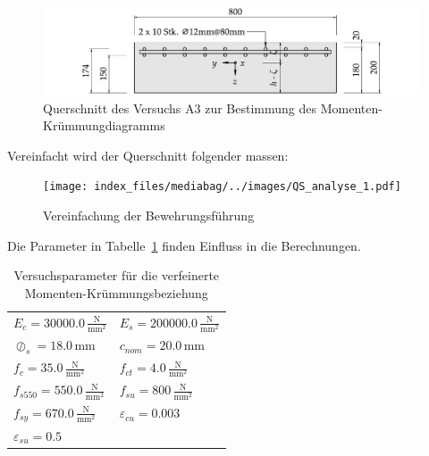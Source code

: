 \documentclass[
  letterpaper,
]{scrreprt}
\begin{document}
\begin{figure}[H]

{\centering \includegraphics{index_files/mediabag/../images/QS_Versuch_A3.pdf}

}

\caption{\label{fig-qs_a3}Querschnitt des Versuchs A3 zur Bestimmung des
Momenten-Krümmungdiagramms}

\end{figure}

Vereinfacht wird der Querschnitt folgender massen:

\begin{figure}[H]

{\centering \texttt{[image: index\_files/mediabag/../images/QS\_analyse\_1.pdf]}

}

\caption{Vereinfachung der Bewehrungsführung}

\end{figure}

Die Parameter in Tabelle~\ref{tbl-params_krummung} finden Einfluss in
die Berechnungen.

\hypertarget{tbl-params_krummung}{}
\begin{longtable}[]{@{}
  >{\raggedright\arraybackslash}p{}
  >{\raggedright\arraybackslash}p{}@{}}
\caption{\label{tbl-params_krummung}Versuchsparameter für die
verfeinerte Momenten-Krümmungsbeziehung}\tabularnewline
\toprule\noalign{}
\endfirsthead
\endhead
\bottomrule\noalign{}
\endlastfoot
\(E_{c} = 30000.0 \, \frac{\text{N}}{\text{mm}^{2}}\) &
\(E_{s} = 200000.0 \, \frac{\text{N}}{\text{mm}^{2}}\) \\
\(\oslash_{s} = 18.0 \, \text{mm}\) & \(c_{nom} = 20.0 \, \text{mm}\) \\
\(f_{c} = 35.0 \, \frac{\text{N}}{\text{mm}^{2}}\) &
\(f_{ct} = 4.0 \, \frac{\text{N}}{\text{mm}^{2}}\) \\
\(f_{s550} = 550.0 \, \frac{\text{N}}{\text{mm}^{2}}\) &
\(f_{su} = 800 \, \frac{\text{N}}{\text{mm}^{2}}\) \\
\(f_{sy} = 670.0 \, \frac{\text{N}}{\text{mm}^{2}}\) &
\(\varepsilon_{cu} = 0.003\) \\
\(\varepsilon_{su} = 0.5\) & \\
\end{longtable}
\end{document}
